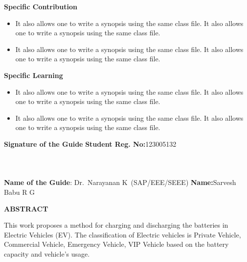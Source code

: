 \documentclass[a4paper, 12pt, oneside]{sastra}
\begin{document}
	
	\noindent \textbf{Specific Contribution}
	\begin{itemize}
		\item It also allows one to write a synopsis using the same class file. It also allows one to write a synopsis using the same class file.
		\item It also allows one to write a synopsis using the same class file. It also allows one to write a synopsis using the same class file.
	\end{itemize}
	\noindent \textbf{Specific Learning}
	\begin{itemize}
		\item It also allows one to write a synopsis using the same class file. It also allows one to write a synopsis using the same class file.
		\item It also allows one to write a synopsis using the same class file. It also allows one to write a synopsis using the same class file.
	\end{itemize}
	
	\vspace*{24pt}
	
	\noindent \textbf{Signature of the Guide} \hspace*{66mm} \textbf{Student Reg. No:}123005132\\
		\\
	\\
	\\
\noindent \textbf{Name of the Guide}:{ Dr.~Narayanan K}~(SAP/EEE/SEEE) \hspace*{10mm} \textbf{Name:}{Sarvesh Babu R G}
\pagebreak
	
	\begin{center}
		\Large{{\textbf{ABSTRACT}}}
	\end{center}
	
	
	\vspace*{24pt}
	
	\noindent This work proposes a method for charging and discharging the batteries in Electric Vehicles (EV). The classification of Electric vehicles is Private Vehicle, Commercial Vehicle, Emergency Vehicle, VIP Vehicle based on the battery capacity and vehicle's usage.
	
\end{document}
